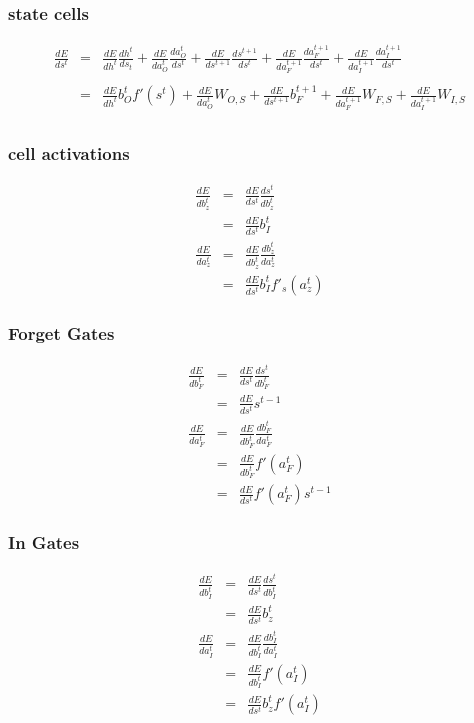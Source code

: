 \documentclass{article}
\begin{document}
\subsubsection{state cells}
\begin{eqnarray*}
\frac{dE}{ds^t}&=&\frac{dE}{dh^t}\frac{dh^t}{ds_t} + \frac{dE}{da_{O}^t}\frac{da_{O}^t}{ds^t}+\frac{dE}{ds^{t+1}}\frac{ds^{t+1}}{ds^t}+\frac{dE}{da_{F}^{t+1}}\frac{da_{F}^{t+1}}{ds^t} + \frac{dE}{da_{I}^{t+1}}\frac{da_{I}^{t+1}}{ds^t}\\ \\
&=& \frac{dE}{dh^t}b_{O}^tf'(s^t)+ \frac{dE}{da_{O}^t}W_{O,S} + \frac{dE}{ds^{t+1}}b_{F}^{t+1} + \frac{dE}{da_{F}^{t+1}}W_{F,S} + \frac{dE}{da_{I}^{t+1}}W_{I,S} \\
\end{eqnarray*}

\subsubsection{cell activations}
\begin{eqnarray*}
\frac{dE}{db_z^t} &=& \frac{dE}{ds^t} \frac{ds^t}{db_z^t} \\
&=&  \frac{dE}{ds^t}b_{I}^t \\
\frac{dE}{da_z^t}  &=& \frac{dE}{db_z^t}\frac{db_z^t}{da_z^t} \\
&=&  \frac{dE}{ds^t} b_{I}^t f'_s(a_z^t)
\end{eqnarray*}

\subsubsection{Forget Gates}
\begin{eqnarray*}
\frac{dE}{db_{F}^t} &=& \frac{dE}{ds^t} \frac{ds^t}{db_{F}^t} \\
&=& \frac{dE}{ds^t}s^{t-1} \\
\frac{dE}{da_{F}^t} &=& \frac{dE}{db_{F}^t}\frac{db_{F}^t}{da_{F}^t} \\
&=& \frac{dE}{db_{F}^t}f'(a_{F}^t) \\
&=& \frac{dE}{ds^t}f'(a_{F}^t)s^{t-1} 
\end{eqnarray*}

\subsubsection{In Gates}
\begin{eqnarray*}
\frac{dE}{db_{I}^t} &=& \frac{dE}{ds^t} \frac{ds^t}{db_{I}^t} \\
&=& \frac{dE}{ds^t} b_z^t \\
\frac{dE}{da_{I}^t} &=& \frac{dE}{db_{I}^t}\frac{db_{I}^t}{da_{I}^t} \\
&=& \frac{dE}{db_{I}^t}f'(a_{I}^t) \\ 
&=& \frac{dE}{ds^t} b_z^t f'(a_{I}^t)
\end{eqnarray*}
\end{document}
